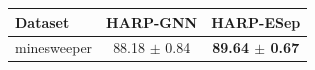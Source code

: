 \begin{tabular}{lcc}
\toprule
Dataset & HARP-GNN & HARP-ESep \\
\midrule
minesweeper & 88.18 $\pm$ 0.84 & \textbf{89.64 $\pm$ 0.67} \\
\bottomrule
\end{tabular}
